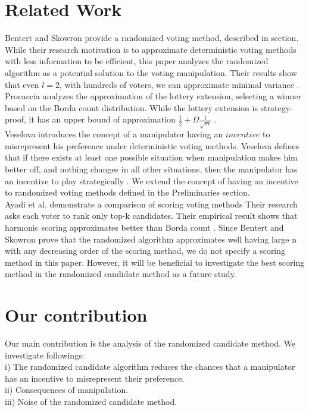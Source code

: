 \documentclass[letterpaper]{article} %
\begin{document}
\section{Related Work}
Bentert and Skowron provide a randomized voting method, described in  section. While their research motivation is to approximate deterministic voting methods with less information to be efficient, this paper analyzes the randomized algorithm as a potential solution to the voting manipulation. Their results show that even $l = 2$, with hundreds of voters, we can approximate minimal variance \cite{Skowron}.\\
Procaccia analyzes the approximation of the lottery extension, selecting a winner based on the Borda count distribution. While the lottery extension is strategy-proof, it has an upper bound of approximation $\frac{1}{2} +\Omega{ \frac{1}{\sqrt{m}} }$  \cite{Procaccia_1}.\\
Veselova introduces the concept of a manipulator having an $incentive$ to misrepresent his preference under deterministic voting methods. Veselova defines that if there exists at least one possible situation when manipulation makes him better off, and nothing changes in all other situations, then the manipulator has an incentive to play strategically \cite{Veselova}. We extend the concept of having an incentive to randomized voting methods defined in the Preliminaries section.\\
Ayadi et al. demonstrate a comparison of scoring voting methods Their research asks each voter to rank only top-k candidates. Their empirical result shows that harmonic scoring approximates better than Borda count \cite{Ayadi}. Since Bentert and Skowron prove that the randomized algorithm approximates well having large n with any decreasing order of the scoring method, we do not specify a scoring method in this paper. However, it will be beneficial to investigate the best scoring method in the randomized candidate method as a future study.

\section{Our contribution}
Our main contribution is the analysis of the randomized candidate method. We investigate followings: \\
i) The randomized candidate algorithm reduces the chances that a manipulator has an incentive to misrepresent their preference. \\
ii) Consequences of manipulation.\\
iii) Noise of the randomized candidate method. 
\end{document}
